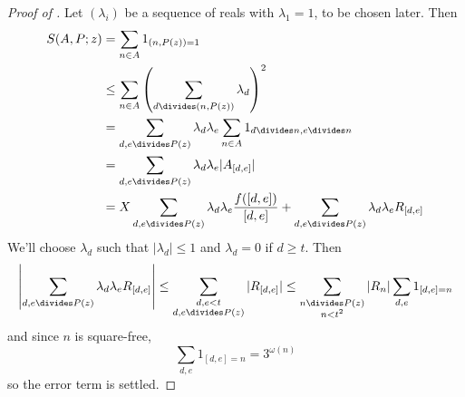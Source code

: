 \documentclass[a4paper]{article}
\begin{document}
\begin{proof}[Proof of ]
  Let \((\lambda_i)\) be a sequence of reals with \(\lambda_1 = 1\), to be chosen later. Then
  \begin{align*}
    S(A, P; z)
    &= \sum_{n \in A} 1_{(n, P(z)) = 1} \\
    &\leq \sum_{n \in A} \left( \sum_{d \divides (n, P(z))} \lambda_d \right)^2 \\
    &= \sum_{d, e \divides P(z)} \lambda_d \lambda_e \sum_{n \in A} 1_{d \divides n, e \divides n} \\
    &= \sum_{d, e \divides P(z)} \lambda_d \lambda_e |A_{[d, e]}| \\
    &= X \sum_{d, e \divides P(z)} \lambda_d \lambda_e \frac{f([d, e])}{[d, e]} + \sum_{d, e \divides P(z)} \lambda_d \lambda_e R_{[d, e]}
  \end{align*}
  We'll choose \(\lambda_d\) such that \(|\lambda_d| \leq 1\) and \(\lambda_d = 0\) if \(d \geq t\). Then
  \[
    \left| \sum_{d, e \divides P(z)} \lambda_d \lambda_e R_{[d, e]} \right|
    \leq \sum_{\substack{d, e < t \\ d, e \divides P(z)}} |R_{[d, e]}|
    \leq \sum_{\substack{n \divides P(z) \\ n < t^2}} |R_n| \sum_{d, e} 1_{[d, e] = n}
  \]
  and since \(n\) is square-free,
  \[
    \sum_{d, e} 1_{[d, e] = n} = 3^{\omega(n)}
  \]
  so the error term is settled.


\end{proof}
\end{document}
